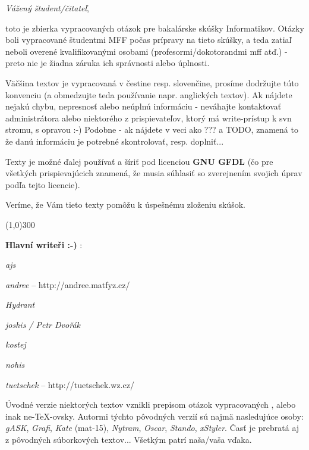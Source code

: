 \emph{Vážený študent/čitateľ},

toto je zbierka vypracovaných otázok pre bakalárske skúšky Informatikov. Otáz\-ky boli vypracované študentmi MFF počas prípravy na tieto skúšky, a teda zatiaľ neboli overené kvalifikovanými osobami (profesormi/dokotorandmi mff atď.) - preto nie je žiadna záruka ich správnosti alebo úplnosti.

Väčšina textov je vypracovaná v čestine resp. slovenčine, prosíme dodržujte túto konvenciu (a obmedzujte teda používanie napr. anglických textov). Ak nájdete nejakú chybu, nepresnosť alebo neúplnú informáciu - neváhajte kontaktovať administrátora alebo niektorého z prispievateľov, ktorý má write-prístup k svn stromu, s opravou :-) Podobne - ak nájdete v  veci ako ??? a TODO, znamená to že danú informáciu je potrebné skontrolovať, resp. doplniť...

Texty je možné ďalej používať a šíriť pod licenciou \textbf{GNU GFDL} (čo pre všetkých prispievajúcich znamená, že musia súhlasiť so zverejnením svojich úprav podľa tejto licencie).

Veríme, že Vám tieto texty pomôžu k úspešnému zloženiu skúšok.

\begin{center}
\line(1,0){300}
\end{center}

\textbf{Hlavní writeři :-) }:
\begin{pitemize}
	\item \emph{ajs}
	\item \emph{andree} -- http://andree.matfyz.cz/
	\item \emph{Hydrant}
	\item \emph{joshis / Petr Dvořák}
	\item \emph{kostej}
	\item \emph{nohis}
	\item \emph{tuetschek} -- http://tuetschek.wz.cz/
\end{pitemize}

Úvodné verzie niektorých textov vznikli prepisom otázok vypracovaných , alebo inak ne-{\TeX}-ovsky. Autormi týchto pôvodných verzií sú najmä nasledujúce osoby:
\emph{gASK}, \emph{Grafi}, \emph{Kate} (mat-15), \emph{Nytram}, \emph{Oscar}, \emph{Stando}, \emph{xStyler}. Časť je prebratá aj z pôvodných súborkových textov...
Všetkým patrí naša/vaša vďaka.
